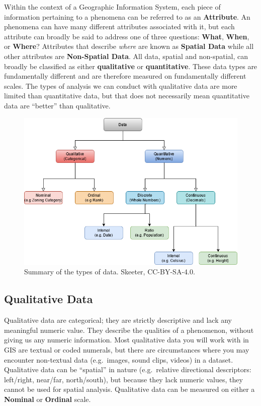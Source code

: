 \documentclass[
]{book}
\begin{document}
Within the context of a Geographic Information System, each piece of information pertaining to a phenomena can be referred to as an \textbf{Attribute}. An phenomena can have many different attributes associated with it, but each attribute can broadly be said to address one of three questions: \textbf{What}, \textbf{When}, or \textbf{Where}? Attributes that describe \emph{where} are known as \textbf{Spatial Data} while all other attributes are \textbf{Non-Spatial Data}. All data, spatial and non-spatial, can broadly be classified as either \textbf{qualitative} or \textbf{quantitative}. These data types are fundamentally different and are therefore measured on fundamentally different scales. The types of analysis we can conduct with qualitative data are more limited than quantitative data, but that does not necessarily mean quantitative data are ``better'' than qualitative.

\begin{figure}
\includegraphics[width=0.75\linewidth]{images/03-data-types} \caption{Summary of the types of data. Skeeter, CC-BY-SA-4.0.}\label{fig:3-data-types}
\end{figure}

\hypertarget{qualitative-data}{%
\subsection{Qualitative Data}\label{qualitative-data}}

Qualitative data are categorical; they are strictly descriptive and lack any meaningful numeric value. They describe the qualities of a phenomenon, without giving us any numeric information. Most qualitative data you will work with in GIS are textual or coded numerals, but there are circumstances where you may encounter non-textual data (e.g.~images, sound clips, videos) in a dataset. Qualitative data can be ``spatial'' in nature (e.g.~relative directional descriptors: left/right, near/far, north/south), but because they lack numeric values, they cannot be used for spatial analysis. Qualitative data can be measured on either a \textbf{Nominal} or \textbf{Ordinal} scale.
\end{document}
